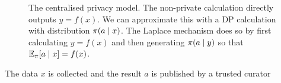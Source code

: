 \begin{frame}
\begin{figure}[H]
    \caption{The centralised privacy model. The non-private calculation directly outputs $y = f(x)$. We can approximate this with a DP calculation with distribution $\pi(a \mid x)$. The Laplace mechanism does so by first calculating $y = f(x)$ and then generating $\pi(a \mid y)$ so that $\mathop{\mbox{\ensuremath{\mathbb{E}}}}\nolimits_\pi[a \mid x] = f(x)$.}
    \label{fig:centralised-privacy}
  \end{figure}

  
  \begin{assumption}
    The data $x$ is collected and the result $a$ is published by a \alert{trusted curator}
  \end{assumption}

\end{frame}


